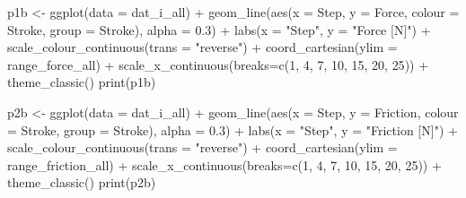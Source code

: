 \documentclass[
]{article}
\newenvironment{Shaded}{\begin{snugshade}}{\end{snugshade}}
\newcommand{\AttributeTok}[1]{\textcolor[rgb]{0.77,0.63,0.00}{#1}}
\newcommand{\DecValTok}[1]{\textcolor[rgb]{0.00,0.00,0.81}{#1}}
\newcommand{\FloatTok}[1]{\textcolor[rgb]{0.00,0.00,0.81}{#1}}
\newcommand{\FunctionTok}[1]{\textcolor[rgb]{0.00,0.00,0.00}{#1}}
\newcommand{\NormalTok}[1]{#1}
\newcommand{\OtherTok}[1]{\textcolor[rgb]{0.56,0.35,0.01}{#1}}
\newcommand{\SpecialCharTok}[1]{\textcolor[rgb]{0.00,0.00,0.00}{#1}}
\newcommand{\StringTok}[1]{\textcolor[rgb]{0.31,0.60,0.02}{#1}}
\begin{document}
\begin{Shaded}
\begin{Highlighting}[]
  
\NormalTok{    p1b }\OtherTok{\textless{}{-}} \FunctionTok{ggplot}\NormalTok{(}\AttributeTok{data =}\NormalTok{ dat\_i\_all) }\SpecialCharTok{+}
        \FunctionTok{geom\_line}\NormalTok{(}\FunctionTok{aes}\NormalTok{(}\AttributeTok{x =}\NormalTok{ Step, }\AttributeTok{y =}\NormalTok{ Force, }\AttributeTok{colour =}\NormalTok{ Stroke, }\AttributeTok{group =}\NormalTok{ Stroke), }\AttributeTok{alpha =} \FloatTok{0.3}\NormalTok{) }\SpecialCharTok{+} 
        \FunctionTok{labs}\NormalTok{(}\AttributeTok{x =} \StringTok{"Step"}\NormalTok{, }\AttributeTok{y =} \StringTok{"Force [N]"}\NormalTok{) }\SpecialCharTok{+} 
        \FunctionTok{scale\_colour\_continuous}\NormalTok{(}\AttributeTok{trans =} \StringTok{"reverse"}\NormalTok{) }\SpecialCharTok{+} 
        \FunctionTok{coord\_cartesian}\NormalTok{(}\AttributeTok{ylim =}\NormalTok{ range\_force\_all) }\SpecialCharTok{+}
        \FunctionTok{scale\_x\_continuous}\NormalTok{(}\AttributeTok{breaks=}\FunctionTok{c}\NormalTok{(}\DecValTok{1}\NormalTok{, }\DecValTok{4}\NormalTok{, }\DecValTok{7}\NormalTok{, }\DecValTok{10}\NormalTok{, }\DecValTok{15}\NormalTok{, }\DecValTok{20}\NormalTok{, }\DecValTok{25}\NormalTok{)) }\SpecialCharTok{+}
          \FunctionTok{theme\_classic}\NormalTok{()}
  \FunctionTok{print}\NormalTok{(p1b)}
  
\NormalTok{    p2b }\OtherTok{\textless{}{-}} \FunctionTok{ggplot}\NormalTok{(}\AttributeTok{data =}\NormalTok{ dat\_i\_all) }\SpecialCharTok{+}
        \FunctionTok{geom\_line}\NormalTok{(}\FunctionTok{aes}\NormalTok{(}\AttributeTok{x =}\NormalTok{ Step, }\AttributeTok{y =}\NormalTok{ Friction, }\AttributeTok{colour =}\NormalTok{ Stroke, }\AttributeTok{group =}\NormalTok{ Stroke), }\AttributeTok{alpha =} \FloatTok{0.3}\NormalTok{) }\SpecialCharTok{+} 
        \FunctionTok{labs}\NormalTok{(}\AttributeTok{x =} \StringTok{"Step"}\NormalTok{, }\AttributeTok{y =} \StringTok{"Friction [N]"}\NormalTok{) }\SpecialCharTok{+} 
        \FunctionTok{scale\_colour\_continuous}\NormalTok{(}\AttributeTok{trans =} \StringTok{"reverse"}\NormalTok{) }\SpecialCharTok{+} 
        \FunctionTok{coord\_cartesian}\NormalTok{(}\AttributeTok{ylim =}\NormalTok{ range\_friction\_all) }\SpecialCharTok{+}
        \FunctionTok{scale\_x\_continuous}\NormalTok{(}\AttributeTok{breaks=}\FunctionTok{c}\NormalTok{(}\DecValTok{1}\NormalTok{, }\DecValTok{4}\NormalTok{, }\DecValTok{7}\NormalTok{, }\DecValTok{10}\NormalTok{, }\DecValTok{15}\NormalTok{, }\DecValTok{20}\NormalTok{, }\DecValTok{25}\NormalTok{)) }\SpecialCharTok{+}
          \FunctionTok{theme\_classic}\NormalTok{()}
  \FunctionTok{print}\NormalTok{(p2b)}
  

\end{Highlighting}
\end{Shaded}
\end{document}
